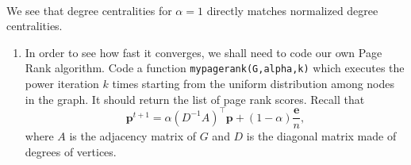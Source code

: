 \documentclass[11pt]{article}
\providecommand{\tightlist}{%
      \setlength{\itemsep}{0pt}\setlength{\parskip}{0pt}}
\begin{document}
    \begin{center}
    \end{center}
    { \hspace*{\fill} \\}
    
    We see that degree centralities for \(\alpha = 1\) directly matches
normalized degree centralities.

    \begin{enumerate}
\def\labelenumi{\alph{enumi})}
\setcounter{enumi}{1}
\tightlist
\item
  In order to see how fast it converges, we shall need to code our own
  Page Rank algorithm. Code a function \texttt{mypagerank(G,alpha,k)}
  which executes the power iteration \(k\) times starting from the
  uniform distribution among nodes in the graph. It should return the
  list of page rank scores. Recall that
  \[ \mathbf{p}^{t+1} = \alpha (D^{-1}A)^{\top}\mathbf{p} + (1-\alpha)\frac{\mathbf{e}}{n}, \]
  where \(A\) is the adjacency matrix of \(G\) and \(D\) is the diagonal
  matrix made of degrees of vertices.
\end{enumerate}
\end{document}
